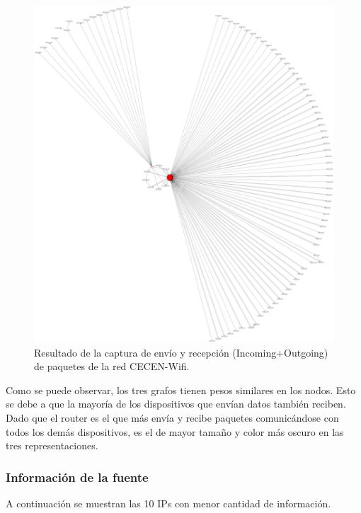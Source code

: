 \documentclass[10pt, a4paper]{article}
\begin{document}
\begin{figure}[H] %
\begin{center}
\includegraphics[width=450pt]{../imgs/cecen-entero.png}
\caption{Resultado de la captura de envío y recepción (Incoming+Outgoing) de paquetes de la red CECEN-Wifi.}
\end{center}
\end{figure}

Como se puede observar, los tres grafos tienen pesos similares en los nodos. Esto se debe a que la mayoría de los dispositivos que envían datos también reciben. Dado que el router es el que más envía y recibe paquetes comunicándose con todos los demás dispositivos, es el de mayor tamaño y color más oscuro en las tres representaciones.

\subsubsection{Información de la fuente}

A continuación se muestran las 10 IPs con menor cantidad de información.
\end{document}
